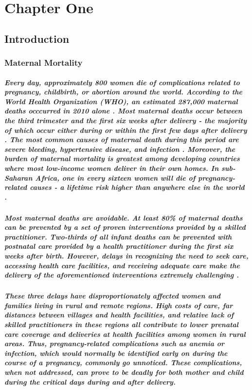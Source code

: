 \chapter{Chapter One}
\section{Introduction}
\subsection{Maternal Mortality}
\paragraph{Every day, approximately 800 women die of complications related to pregnancy, childbirth, or abortion around the world. According to the World Health Organization (WHO), an estimated 287,000 maternal deaths occcurred in 2010 alone \citep{WHO2012}. Most maternal deaths occur between the third trimester and the first six weeks after delivery - the majority of which occur either during or within the first few days after delivery \citep{WHO2012}. The most common causes of maternal death during this period are severe bleeding, hypertensive disease, and infection \citep{WHO2012}. Moreover, the burden of maternal mortality is greatest among developing countries where most low-income women deliver in their own homes. In sub-Saharan Africa, one in every sixteen women will die of pregnancy-related causes - a lifetime risk higher than anywhere else in the world \citep{Ronsmans2006}.}

\paragraph{Most maternal deaths are avoidable. At least 80\% of maternal deaths can be prevented by a set of proven interventions provided by a skilled practitioner. Two-thirds of all infant deaths can be prevented with postnatal care provided by a health practitioner during the first six weeks after birth. However, delays in recognizing the need to seek care, accessing health care facilities, and receiving  adequate care make the delivery of the aforementioned interventions extremely challenging \citep{Thaddeus1994}. }

\paragraph{These three delays have disproportionately affected women and families living in rural and remote regions. High costs of care, far distances between villages and health facilities, and relative lack of skilled practitioners in these regions all contribute to lower prenatal care coverage and deliveries at health facilities among women in rural areas. Thus, pregnancy-related complications such as anemia or infection, which would normally be identified early on during the course of a pregnancy, commonly go unnoticed. These complications, when not addressed, can prove to be deadly for both mother and child during the critical days during and after delivery.}

